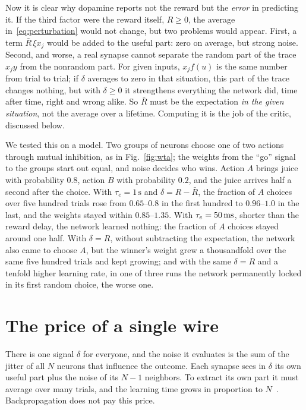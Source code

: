 Now it is clear why dopamine reports not the reward but the \emph{error} in predicting it. If the third factor were the reward itself, $R\ge0$, the average in~\eqref{eq:perturbation} would not change, but two problems would appear. First, a term $\bar R\,\xi x_j$ would be added to the useful part: zero on average, but strong noise. Second, and worse, a real synapse cannot separate the random part of the trace $x_jy$ from the nonrandom part. For given inputs, $x_jf(u)$ is the same number from trial to trial; if $\delta$ averages to zero in that situation, this part of the trace changes nothing, but with $\delta\ge0$ it strengthens everything the network did, time after time, right and wrong alike. So $\bar R$ must be the expectation \emph{in the given situation}, not the average over a lifetime. Computing it is the job of the critic, discussed below.

We tested this on a model. Two groups of  neurons choose one of two actions through mutual inhibition, as in Fig.~\ref{fig:wta}; the weights from the ``go'' signal to the groups start out equal, and noise decides who wins. Action $A$ brings juice with probability $0.8$, action $B$ with probability $0.2$, and the juice arrives half a second after the choice. With $\tau_e=1\,\text{s}$ and $\delta=R-\bar R$, the fraction of $A$ choices over five hundred trials rose from $0.65$--$0.8$ in the first hundred to $0.96$--$1.0$ in the last, and the weights stayed within $0.85$--$1.35$. With $\tau_e=50\,\text{ms}$, shorter than the reward delay, the network learned nothing: the fraction of $A$ choices stayed around one half. With $\delta=R$, without subtracting the expectation, the network also came to choose $A$, but the winner's weight grew a thousandfold over the same five hundred trials and kept growing; and with the same $\delta=R$ and a tenfold higher learning rate, in one of three runs the network permanently locked in its first random choice, the worse one.

\section{The price of a single wire}

There is one signal $\delta$ for everyone, and the noise it evaluates is the sum of the jitter of all $N$ neurons that influence the outcome. Each synapse sees in $\delta$ its own useful part plus the noise of its $N-1$ neighbors. To extract its own part it must average over many trials, and the learning time grows in proportion to $N$~\cite{Werfel2005}. Backpropagation does not pay this price.

